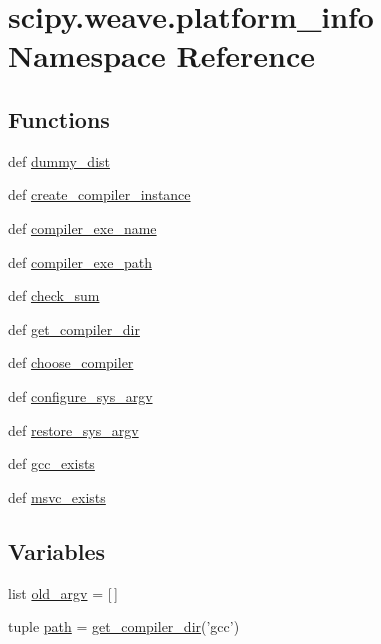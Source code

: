 \hypertarget{namespacescipy_1_1weave_1_1platform__info}{}\section{scipy.\+weave.\+platform\+\_\+info Namespace Reference}
\label{namespacescipy_1_1weave_1_1platform__info}
\subsection*{Functions}
\begin{DoxyCompactItemize}
\item 
def \hyperlink{namespacescipy_1_1weave_1_1platform__info_ad708615f047b1b67c40442cc38dd6bac}{dummy\+\_\+dist}
\item 
def \hyperlink{namespacescipy_1_1weave_1_1platform__info_ac34aaa2a4213b48abbe39a245dda1a53}{create\+\_\+compiler\+\_\+instance}
\item 
def \hyperlink{namespacescipy_1_1weave_1_1platform__info_a93f7cecd1ca62599a014ea7efff47507}{compiler\+\_\+exe\+\_\+name}
\item 
def \hyperlink{namespacescipy_1_1weave_1_1platform__info_a9fe934c5d2160d7a3666cbb9dbed983e}{compiler\+\_\+exe\+\_\+path}
\item 
def \hyperlink{namespacescipy_1_1weave_1_1platform__info_a4492a3e8d5b96642d233496acea70cdd}{check\+\_\+sum}
\item 
def \hyperlink{namespacescipy_1_1weave_1_1platform__info_af1bc39e3e4246048513bfb8c40a19d7c}{get\+\_\+compiler\+\_\+dir}
\item 
def \hyperlink{namespacescipy_1_1weave_1_1platform__info_a8b62e6f8c95307191373fedc79fadbca}{choose\+\_\+compiler}
\item 
def \hyperlink{namespacescipy_1_1weave_1_1platform__info_acaf92c71c8c0d28bfa7af77a9a0745a6}{configure\+\_\+sys\+\_\+argv}
\item 
def \hyperlink{namespacescipy_1_1weave_1_1platform__info_a86ba4eb471e8ca8c45fd98d2c4535acc}{restore\+\_\+sys\+\_\+argv}
\item 
def \hyperlink{namespacescipy_1_1weave_1_1platform__info_a31731ae7a7723f87375acecd5d98ad0d}{gcc\+\_\+exists}
\item 
def \hyperlink{namespacescipy_1_1weave_1_1platform__info_a76ac07d49a791be50b6b305006c4ba60}{msvc\+\_\+exists}
\end{DoxyCompactItemize}
\subsection*{Variables}
\begin{DoxyCompactItemize}
\item 
list \hyperlink{namespacescipy_1_1weave_1_1platform__info_a4ff2a9697146d5bf6efc011bec30017a}{old\+\_\+argv} = \mbox{[}$\,$\mbox{]}
\item 
tuple \hyperlink{namespacescipy_1_1weave_1_1platform__info_aa5ae33dd1f0756bd777a012b936b2df6}{path} = \hyperlink{namespacescipy_1_1weave_1_1platform__info_af1bc39e3e4246048513bfb8c40a19d7c}{get\+\_\+compiler\+\_\+dir}('gcc')
\end{DoxyCompactItemize}


